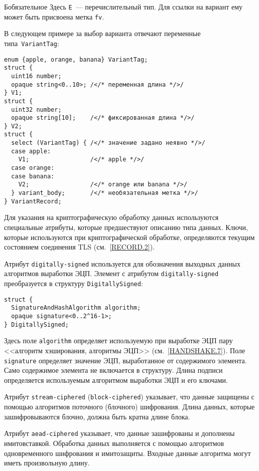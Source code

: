 \begin{appendix}{Б}{обязательное}
Здесь \lstinline{E}~--- перечислительный тип. Для ссылки на вариант ему 
может быть присвоена метка \lstinline{fv}. 

В следующем примере за выбор варианта отвечают переменные 
типа~\lstinline{VariantTag}:  
\begin{lstlisting}
enum {apple, orange, banana} VariantTag;
struct {
  uint16 number;
  opaque string<0..10>; /</* переменная длина */>/
} V1;
struct {
  uint32 number;
  opaque string[10];    /</* фиксированная длина */>/
} V2;
struct {
  select (VariantTag) { /</* значение задано неявно */>/
  case apple:
    V1;                 /</* apple */>/
  case orange:
  case banana:
    V2;                 /</* orange или banana */>/
  } variant_body;       /</* необязательная метка */>/
} VariantRecord;
\end{lstlisting}

\label{SYNTAX.7}

Для указания на криптографическую обработку данных используются 
специальные атрибуты, которые предшествуют описанию типа данных. Ключи, 
которые используются при криптографической обработке, определяются текущим 
состоянием соединения TLS (см.~\ref{RECORD.2}). 

Атрибут \lstinline{digitally-signed} используется для обозначения выходных данных 
алгоритмов выработки ЭЦП. Элемент с атрибутом \lstinline{digitally-signed} 
преобразуется в структуру \lstinline{DigitallySigned}: 
\begin{lstlisting}
struct {
  SignatureAndHashAlgorithm algorithm;
  opaque signature<0..2^16-1>;
} DigitallySigned;
\end{lstlisting}

Здесь поле \lstinline{algorithm} определяет используемую при выработке ЭЦП пару 
<<алгоритм хэширования, алгоритмы ЭЦП>> (см.~\ref{HANDSHAKE.7}). 
Поле \lstinline{signature} определяет значение ЭЦП, выработанное от 
содержимого элемента. Само содержимое элемента не включается в структуру. 
Длина подписи определяется используемым алгоритмом выработки ЭЦП и его ключами. 

Атрибут \lstinline{stream-ciphered} (\lstinline{block-ciphered}) 
указывает, что данные защищены с помощью
алгоритмов поточного (блочного) шифрования. 
Длина данных, которые зашифровываются блочно, должна быть кратна длине блока. 

Атрибут \lstinline{aead-ciphered} указывает, что данные зашифрованы и дополнены 
имитовставкой. Обработка данных выполняется с помощью алгоритмов 
одновременного шифрования и имитозащиты. Входные данные алгоритма могут 
иметь произвольную длину.  


\end{appendix}
